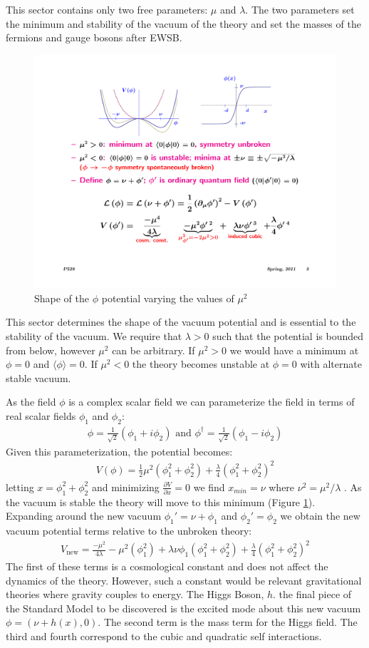This sector contains only two free parameters: $\mu$ and $\lambda$. The two parameters set the minimum and stability of the 
vacuum of the theory and set the masses of the fermions and gauge bosons after EWSB. 

\begin{figure}
\begin{center}
\includegraphics[width=.45\textwidth]{pics/scalar_potential}
\end{center}
\caption{Shape of the $\phi$ potential varying the values of $\mu^2$}
\label{fig:scalar_potential}
\end{figure}

This sector determines the shape of the vacuum potential and is essential to the stability of the vacuum. We require that $\lambda>0$ such that the potential is bounded from below, however $\mu^2$ can be arbitrary. If $\mu^2 >0$ we would have a minimum at $\phi=0$ and $\langle \phi \rangle =0$. If $\mu^2 < 0$ the theory becomes unstable at $\phi=0$ with alternate stable vacuum. 

As the field $\phi$ is a complex scalar field we can parameterize the field in terms
of real scalar fields $\phi_1$ and $\phi_2$:
\begin{align*}
\phi = \frac{1}{\sqrt{2}} ( \phi_1 + i \phi_2) \text{ and } \phi^\dagger = \frac{1}{\sqrt{2}} ( \phi_1 - i \phi_2)
\end{align*}
Given this parameterization, the potential becomes:
\begin{align*}
V(\phi) = \frac{1}{2}\mu^2 ( \phi_1^2 + \phi_2^2 ) + \frac{\lambda}{4} ( \phi_1^2 + \phi_2^2)^2 
\end{align*}
letting $x = \phi_1^2 + \phi_2^2$ and minimizing $\frac{\partial V}{\partial x } = 0$ we find $x_{min} = \nu$ where $\nu^2 = \mu^2/\lambda$ . 
As the vacuum is stable the theory will move to this minimum (Figure \ref{fig:scalar_potential}). Expanding
around the new vacuum $\phi_1' = \nu + \phi_1$ and $\phi_2' = \phi_2$ we obtain the new vacuum potential terms
relative to the unbroken theory:
\begin{align*}
V_{\textrm{new}} = \frac{-\mu^2}{4\lambda} - \mu^2 (\phi_1^2) + \lambda \nu \phi_1 (\phi_1^2 +\phi_2^2) + \frac{\lambda}{4}(\phi_1^2 + \phi_2^2)^2 
\end{align*}
The first of these terms is a cosmological constant and does not affect the dynamics of the theory. However,
such a constant would be relevant gravitational theories where gravity couples to energy. The Higgs Boson, $h$. the final piece of the Standard Model to be discovered is the excited mode about this new vacuum $\phi = (\nu + h(x), 0)$.
The second term is the mass term for the Higgs field. The third and fourth correspond to the cubic and quadratic self interactions. 

